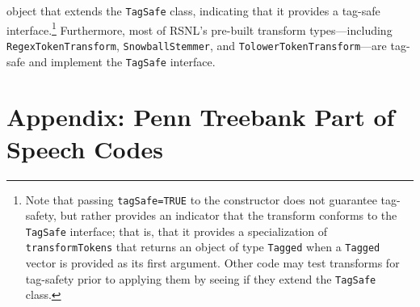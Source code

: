 \documentclass[11pt]{article}
\def\RSNL{{\normalfont\fontseries{b}\selectfont RSNL}}
\let\code=\texttt
\let\rclass=\texttt
\begin{document}
object that extends the \rclass{TagSafe} class, indicating that it
provides a tag-safe interface.\footnote{Note that passing
\code{tagSafe=TRUE} to the constructor does not guarantee tag-safety,
but rather provides an indicator that the transform conforms to the
\rclass{TagSafe} interface; that is, that it provides a specialization
of \code{transformTokens} that returns an object of type \code{Tagged}
when a \code{Tagged} vector is provided as its first argument.  Other
code may test transforms for tag-safety prior to applying them by
seeing if they extend the \rclass{TagSafe} class.}
Furthermore,  most of \RSNL's pre-built transform types---including
\rclass{RegexTokenTransform}, \rclass{SnowballStemmer}, and
\rclass{TolowerTokenTransform}---are tag-safe and implement the
\rclass{TagSafe} interface.

\section{Appendix: Penn Treebank Part of Speech Codes}
\end{document}
